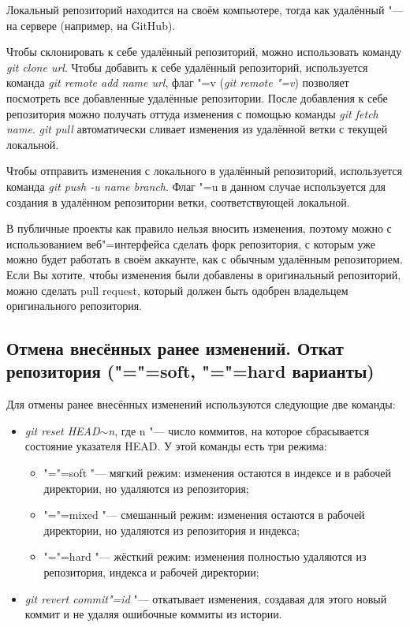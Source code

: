 \documentclass[12pt]{article}
\begin{document}
Локальный репозиторий находится на своём компьютере, тогда как удалённый "--- на сервере (например, на GitHub).

Чтобы склонировать к себе удалённый репозиторий, можно использовать команду \textit{git clone url}. Чтобы добавить к себе удалённый репозиторий, используется команда \textit{git remote add name url}, флаг "=v (\textit{git remote "=v}) позволяет посмотреть все добавленные удалённые репозитории. После добавления к себе репозитория можно получать оттуда изменения с помощью команды \textit{git fetch name}. \textit{git pull} автоматически сливает изменения из удалённой ветки с текущей локальной.

Чтобы отправить изменения с локального в удалённый репозиторий, используется команда \textit{git push -u name branch}. Флаг "=u в данном случае используется для создания в удалённом репозитории ветки, соответствующей локальной.

В публичные проекты как правило нельзя вносить изменения, поэтому можно с использованием веб"=интерфейса сделать форк репозитория, с которым уже можно будет работать в своём аккаунте, как с обычным удалённым репозиторием. Если Вы хотите, чтобы изменения были добавлены в оригинальный репозиторий, можно сделать pull request, который должен быть одобрен владельцем оригинального репозитория.

\subsection{Отмена внесённых ранее изменений. Откат репозитория ("="=soft, "="=hard варианты)}
Для отмены ранее внесённых изменений используются следующие две команды:
\begin{itemize}
\item \textit{git reset HEAD$\sim$n}, где n "--- число коммитов, на которое сбрасывается состояние указателя HEAD. У этой команды есть три режима:
	\begin{itemize}
	\item "="=soft "--- мягкий режим: изменения остаются в индексе и в рабочей директории, но удаляются из репозитория;
	\item "="=mixed "--- смешанный режим: изменения остаются в рабочей директории, но удаляются из репозитория и индекса;
	\item "="=hard "--- жёсткий режим: изменения полностью удаляются из репозитория, индекса и рабочей директории;
	\end{itemize}
\item \textit{git revert commit"=id} "--- откатывает изменения, создавая для этого новый коммит и не удаляя ошибочные коммиты из истории.
\end{itemize}
\end{document}
